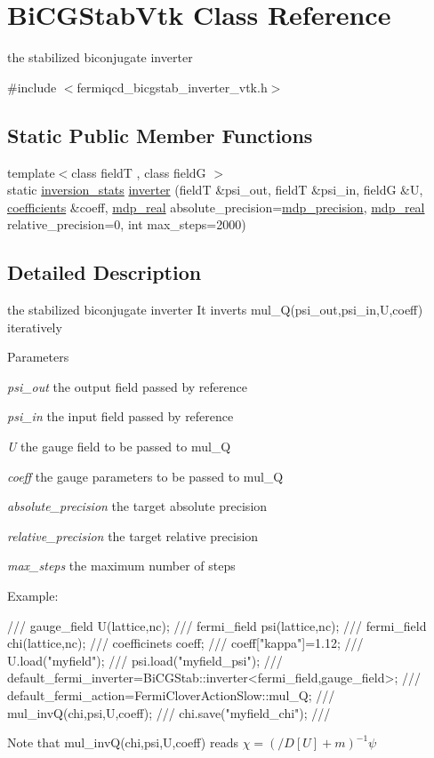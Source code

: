 \hypertarget{class_bi_c_g_stab_vtk}{
\section{BiCGStabVtk Class Reference}
\label{class_bi_c_g_stab_vtk}
}


the stabilized biconjugate inverter  


{\ttfamily \#include $<$fermiqcd\_\-bicgstab\_\-inverter\_\-vtk.h$>$}\subsection*{Static Public Member Functions}
\begin{DoxyCompactItemize}
\item 
{\footnotesize template$<$class fieldT , class fieldG $>$ }\\static \hyperlink{classinversion__stats}{inversion\_\-stats} \hyperlink{class_bi_c_g_stab_vtk_a482170748a679733c475311ae45f014f}{inverter} (fieldT \&psi\_\-out, fieldT \&psi\_\-in, fieldG \&U, \hyperlink{classcoefficients}{coefficients} \&coeff, \hyperlink{mdp__global__vars_8h_a049e4c1d4e74d644878a42f9909463e4}{mdp\_\-real} absolute\_\-precision=\hyperlink{mdp__global__vars_8h_a443a4ca745298420893e113a7ac926a9}{mdp\_\-precision}, \hyperlink{mdp__global__vars_8h_a049e4c1d4e74d644878a42f9909463e4}{mdp\_\-real} relative\_\-precision=0, int max\_\-steps=2000)
\end{DoxyCompactItemize}


\subsection{Detailed Description}
the stabilized biconjugate inverter It inverts mul\_\-Q(psi\_\-out,psi\_\-in,U,coeff) iteratively 
\begin{DoxyParams}{Parameters}
\item[{\em psi\_\-out}]the output field passed by reference \item[{\em psi\_\-in}]the input field passed by reference \item[{\em U}]the gauge field to be passed to mul\_\-Q \item[{\em coeff}]the gauge parameters to be passed to mul\_\-Q \item[{\em absolute\_\-precision}]the target absolute precision \item[{\em relative\_\-precision}]the target relative precision \item[{\em max\_\-steps}]the maximum number of steps\end{DoxyParams}
Example: \begin{DoxyVerb}
/// gauge_field U(lattice,nc);
/// fermi_field psi(lattice,nc);
/// fermi_field chi(lattice,nc);
/// coefficinets coeff;
/// coeff["kappa"]=1.12;
/// U.load("myfield");
/// psi.load("myfield_psi");
/// default_fermi_inverter=BiCGStab::inverter<fermi_field,gauge_field>;
/// default_fermi_action=FermiCloverActionSlow::mul_Q;
/// mul_invQ(chi,psi,U,coeff);
/// chi.save("myfield_chi");
/// \end{DoxyVerb}
 Note that mul\_\-invQ(chi,psi,U,coeff) reads $ \chi=(/\!\!\!D[U]+m)^{-1}\psi $ 


